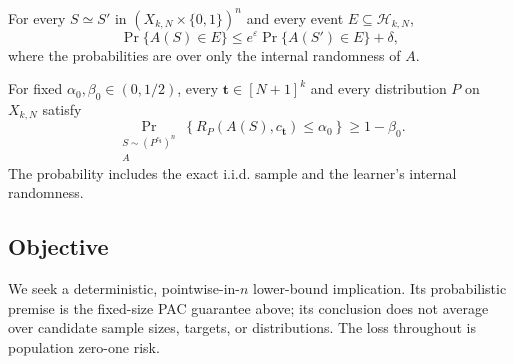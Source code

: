 \begin{assumption}\label{assump:central-dp}
For every $S\simeq S'$ in $(X_{k,N}\times\{0,1\})^n$ and every event
$E\subseteq\mathcal H_{k,N}$,
\[
\Pr\{A(S)\in E\}
\le e^\varepsilon\Pr\{A(S')\in E\}+\delta,
\]
where the probabilities are over only the internal randomness of $A$.
\end{assumption}

\begin{assumption}\label{assump:distribution-free-realizable-pac}
For fixed $\alpha_0,\beta_0\in(0,1/2)$, every
$\boldsymbol t\in[N+1]^k$ and every distribution $P$ on $X_{k,N}$ satisfy
\[
\Pr_{\substack{S\sim(P^{c_{\boldsymbol t}})^n\\A}}
\left\{R_P(A(S),c_{\boldsymbol t})\le\alpha_0\right\}
\ge1-\beta_0.
\]
The probability includes the exact i.i.d. sample and the learner's internal
randomness.
\end{assumption}

\subsection{Objective}

We seek a deterministic, pointwise-in-$n$ lower-bound implication.  Its
probabilistic premise is the fixed-size PAC guarantee above; its conclusion
does not average over candidate sample sizes, targets, or distributions.  The
loss throughout is population zero-one risk.
